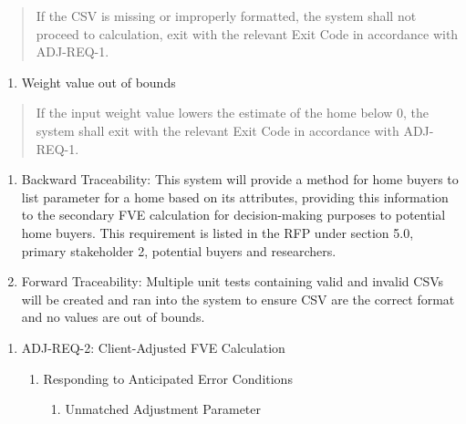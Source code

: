 \begin{quote}
If the CSV is missing or improperly formatted, the system shall not
proceed to calculation, \hl{}exit with the relevant Exit Code in
accordance with ADJ-REQ-1.
\end{quote}

\begin{enumerate}
\def\labelenumi{\roman{enumi}.}
\setcounter{enumi}{1}
\item
  Weight value out of bounds
\end{enumerate}

\begin{quote}
If the input weight value lowers the estimate of the home below 0, the
system shall exit with the relevant Exit Code in accordance with
ADJ-REQ-1.
\end{quote}

\begin{enumerate}
\def\labelenumi{\alph{enumi}.}
\setcounter{enumi}{1}
\item
  Backward Traceability: This system will provide a method for home
  buyers to list parameter for a home based on its attributes, providing
  this information to the secondary FVE calculation for decision-making
  purposes to potential home buyers. This requirement is listed in the
  RFP under section 5.0, primary stakeholder 2, potential buyers and
  researchers.
\item
  Forward Traceability: Multiple unit tests containing valid and invalid
  CSVs will be created and ran into the system to ensure CSV are the
  correct format and no values are out of bounds.
\end{enumerate}

\begin{enumerate}
\def\labelenumi{\Roman{enumi})}
\setcounter{enumi}{1}
\item
  ADJ-REQ-2: Client-Adjusted FVE Calculation

  \begin{enumerate}
  \def\labelenumii{\alph{enumii}.}
  \item
    Responding to Anticipated Error Conditions

    \begin{enumerate}
    \def\labelenumiii{\roman{enumiii}.}
    \item
      Unmatched Adjustment Parameter
    \end{enumerate}
  \end{enumerate}
\end{enumerate}

